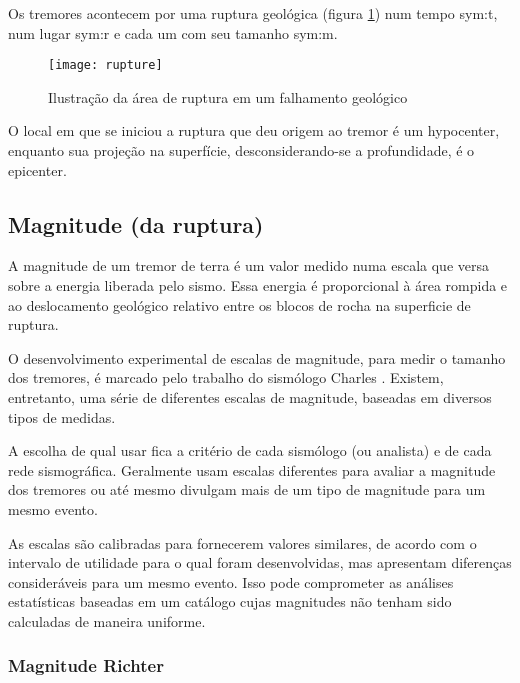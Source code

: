 Os tremores acontecem por uma ruptura geológica (figura \ref{f:rupture}) 
num tempo \gls{sym:t}, num lugar \gls{sym:r} e cada um
com seu tamanho \gls{sym:m}.

\begin{figure}[H]
   \centering
   \texttt{[image: rupture]}
   \caption[Ilustração da área de ruptura em um falhamento geológico]
   		   {Ilustração da área de ruptura em um falhamento geológico\footnotemark} 
   \label{f:rupture}
\end{figure} 


O local em que se iniciou a ruptura que deu origem ao tremor é um \gls{hypocenter},
enquanto sua projeção na superfície, desconsiderando-se a profundidade, é o \gls{epicenter}.


\subsection[Magnitude]{Magnitude (da ruptura)}
\label{sec:magnitude}

A magnitude de um tremor de terra é um valor medido numa escala que versa sobre a energia liberada pelo sismo.
Essa energia é proporcional à área rompida e ao deslocamento geológico relativo entre os blocos de rocha na superficie
de ruptura.

O desenvolvimento experimental de escalas de magnitude, para medir o tamanho dos tremores,
é marcado pelo trabalho do sismólogo Charles \citet{richter_1935}. Existem, entretanto, 
uma série de diferentes escalas de magnitude, baseadas em diversos tipos de medidas. 

A escolha de qual usar fica a critério
de cada sismólogo (ou analista) e de cada rede sismográfica. 
Geralmente usam escalas diferentes
para avaliar a magnitude dos tremores ou até mesmo divulgam mais de um tipo de magnitude para
um mesmo evento.

As escalas são calibradas para fornecerem valores similares, de acordo com
o intervalo de utilidade para o qual foram desenvolvidas, mas apresentam diferenças consideráveis para um mesmo evento.
Isso pode comprometer as análises estatísticas baseadas em um catálogo 
cujas magnitudes não tenham sido calculadas de maneira uniforme.


\subsubsection{Magnitude Richter}
\label{sec:magnitude_richter}

